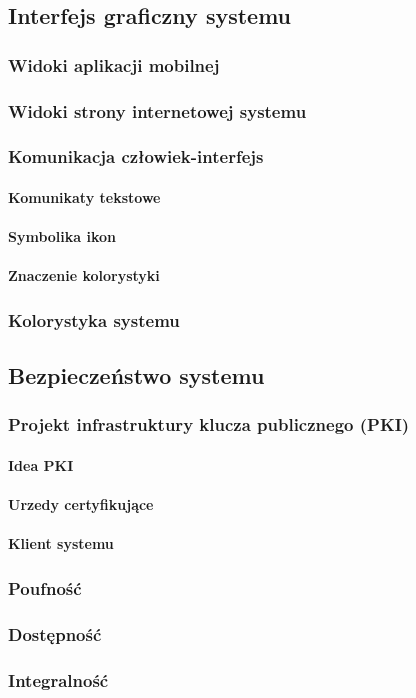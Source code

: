 \newpage
\subsection{Interfejs graficzny systemu}

	\subsubsection{Widoki aplikacji mobilnej}
	
	\subsubsection{Widoki strony internetowej systemu}
	
	\subsubsection{Komunikacja człowiek-interfejs}
	
		\paragraph{Komunikaty tekstowe}
		\paragraph{Symbolika ikon}
		\paragraph{Znaczenie kolorystyki}
		
	\subsubsection{Kolorystyka systemu}
	
\newpage
\subsection{Bezpieczeństwo systemu}
	\subsubsection{Projekt infrastruktury klucza publicznego (PKI)}
		\paragraph{Idea PKI}
		\paragraph{Urzedy certyfikujące}
		\paragraph{Klient systemu}
	\subsubsection{Poufność}
	\subsubsection{Dostępność}
	\subsubsection{Integralność}
